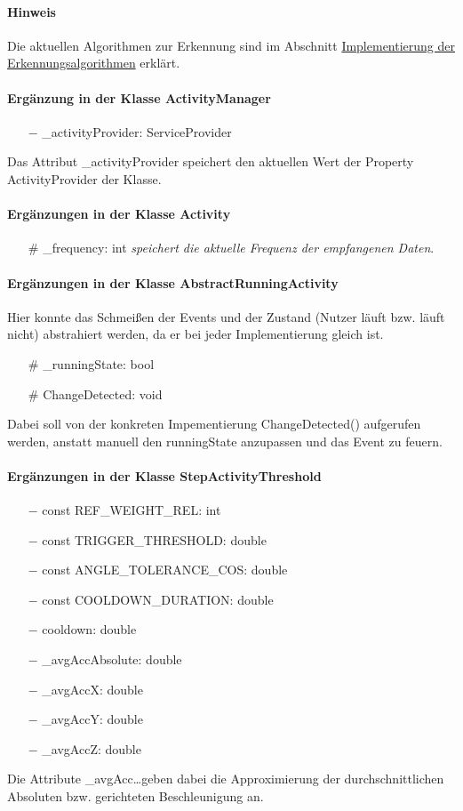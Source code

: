 \documentclass[a4paper,12pt]{article}
\begin{document}
\paragraph{Hinweis}
Die aktuellen Algorithmen zur Erkennung sind im Abschnitt \hyperref[algorithmen]{Implementierung der Erkennungsalgorithmen} erklärt.
\paragraph{Ergänzung in der Klasse ActivityManager}
\begin{itemize}
	\item [$-$]\_activityProvider: ServiceProvider 
\end{itemize}
Das Attribut \_activityProvider speichert den aktuellen Wert der Property ActivityProvider der Klasse.
\paragraph{Ergänzungen in der Klasse Activity}
\begin{itemize}
	\item [\#] \_frequency: int \textit{speichert die aktuelle Frequenz der empfangenen Daten}.
\end{itemize}
\paragraph{Ergänzungen in der Klasse AbstractRunningActivity}
Hier konnte das Schmeißen der Events und der Zustand (Nutzer läuft bzw. läuft nicht) abstrahiert werden, da er bei jeder Implementierung gleich ist.
\begin{itemize}
	\item [\#] \_runningState: bool
	\item [\#] ChangeDetected: void 
\end{itemize}
Dabei soll von der konkreten Impementierung ChangeDetected() aufgerufen werden, anstatt manuell den runningState anzupassen und das Event zu feuern.
\paragraph{Ergänzungen in der Klasse StepActivityThreshold}
\begin{itemize}
	\item [$-$] const REF\_WEIGHT\_REL: int
	\item [$-$] const TRIGGER\_THRESHOLD: double
	\item [$-$] const ANGLE\_TOLERANCE\_COS: double
	\item [$-$] const COOLDOWN\_DURATION: double
	\item [$-$] cooldown: double
	\item [$-$] \_avgAccAbsolute: double
	\item [$-$] \_avgAccX: double
	\item [$-$] \_avgAccY: double
	\item [$-$] \_avgAccZ: double
\end{itemize}
Die Attribute \_avgAcc\dots geben dabei die Approximierung der durchschnittlichen Absoluten bzw. gerichteten Beschleunigung an.
\end{document}
